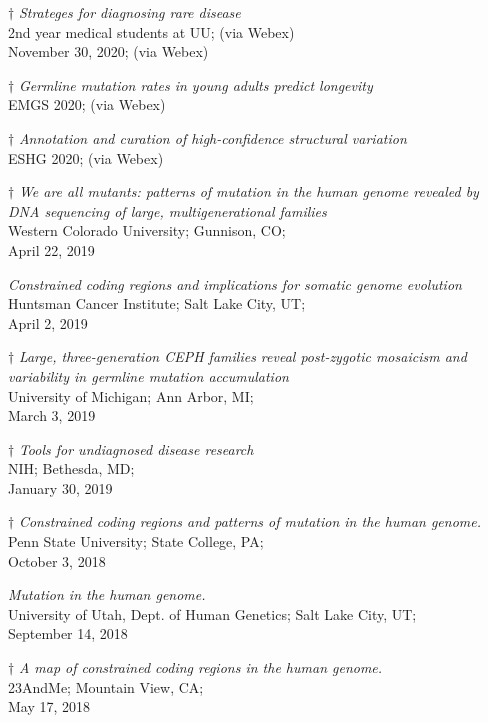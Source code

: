 \documentclass[margin,line]{cv}
\begin{document}
\begin{resume}
    $\dagger$ \textit{Strateges for diagnosing rare disease} \\
    2nd year medical students at UU; (via Webex) \\
    November 30, 2020; (via Webex)

    $\dagger$ \textit{Germline mutation rates in young adults predict longevity} \\
    EMGS 2020; (via Webex) 

    $\dagger$ \textit{Annotation and curation of high-confidence structural variation} \\
    ESHG 2020; (via Webex)

    $\dagger$ \textit{We are all mutants: patterns of mutation in the
human genome revealed by DNA sequencing of large, multigenerational families
} \\
    Western Colorado University; Gunnison, CO; \\
    April 22, 2019

    \textit{Constrained coding regions and implications for somatic genome evolution} \\
    Huntsman Cancer Institute; Salt Lake City, UT; \\
    April 2, 2019

    $\dagger$ \textit{Large, three-generation CEPH families reveal post-zygotic mosaicism and variability in germline mutation accumulation} \\
    University of Michigan; Ann Arbor, MI; \\
    March 3, 2019

    $\dagger$ \textit{Tools for undiagnosed disease research} \\
    NIH; Bethesda, MD; \\
    January 30, 2019

    $\dagger$ \textit{Constrained coding regions and patterns of mutation in the human genome.
} \\
    Penn State University; State College, PA; \\
    October 3, 2018

    \textit{Mutation in the human genome.
} \\
    University of Utah, Dept. of Human Genetics; Salt Lake City, UT; \\
    September 14, 2018

    $\dagger$ \textit{A map of constrained coding regions in the human genome.
} \\
    23AndMe; Mountain View, CA; \\
    May 17, 2018


\end{resume}
\end{document}
